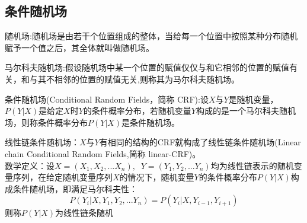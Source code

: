 \documentclass[UTF8]{article}%
\begin{document}
	\subsection{条件随机场}
	随机场:随机场是由若干个位置组成的整体，当给每一个位置中按照某种分布随机赋予一个值之后，其全体就叫做随机场。
	
	马尔科夫随机场:假设随机场中某一个位置的赋值仅仅与和它相邻的位置的赋值有关，和与其不相邻的位置的赋值无关,则称其为马尔科夫随机场。
	
	条件随机场(Conditional Random Fields，简称 CRF):设$X$与$Y$是随机变量，$P(Y|X)$是给定$X$时$Y$的条件概率分布，若随机变量$Y$构成的是一个马尔科夫随机场，则称条件概率分布$P(Y|X)$是条件随机场。
	
	线性链条件随机场：$X$与$Y$有相同的结构的CRF就构成了线性链条件随机场(Linear chain Conditional Random Fields,简称 linear-CRF)。\\
	数学定义：设$X =(X_1,X_2,...X_n),\;\;Y=(Y_1,Y_2,...Y_n)$均为线性链表示的随机变量序列，在给定随机变量序列$X$的情况下，随机变量$Y$的条件概率分布$ P(Y|X) $构成条件随机场，即满足马尔科夫性：
	$$P(Y_i|X,Y_1,Y_2,...Y_n) = P(Y_i|X,Y_{i-1},Y_{i+1})$$
	则称$ P(Y|X) $为线性链条随机
\end{document}
